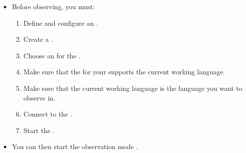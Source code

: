 % 
%
%
\label{observeprereq}
\begin{itemize}
\item Before observing, you must:
\begin{enumerate}
\item Define and configure an \gdaut{} .
\item Create a \gdsuite{} .
\item Choose an \gdaut{} for the \gdsuite{} .
\item Make sure that the \gdaut{} for your \gdsuite{} supports the current working language.
\item Make sure that the current working language is the language you want to observe in.
\item Connect to the \gdagent{} .
\item Start the \gdaut{} .
\end{enumerate}
\item You can then start the observation mode .
\end{itemize}







